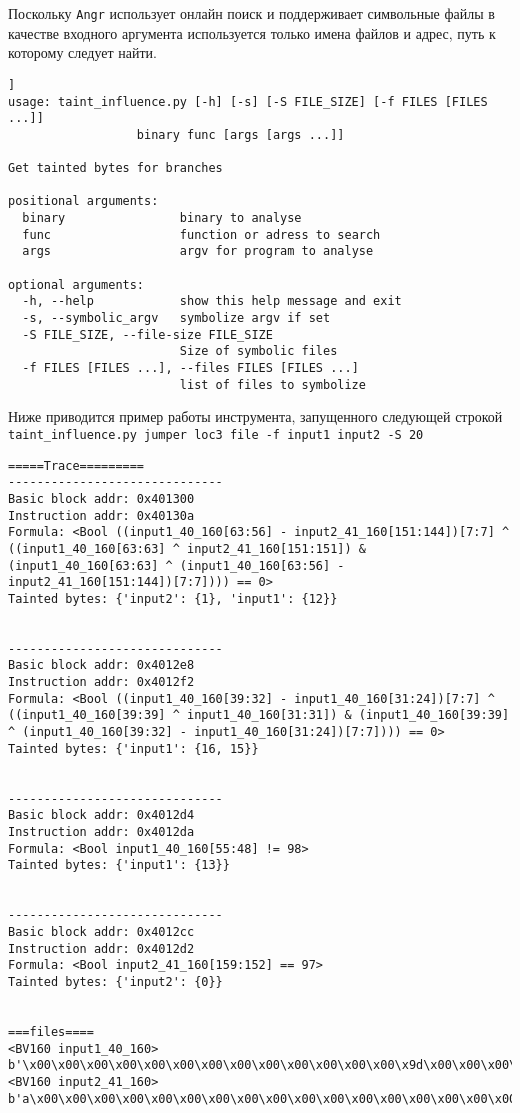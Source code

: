 Поскольку \texttt{Angr} использует онлайн поиск и поддерживает символьные файлы в качестве входного аргумента используется только имена файлов и адрес, путь к которому следует найти.

\begin{lstlisting}[caption=Интерфейс инструмента основанного на angr, captionpos=b]]
usage: taint_influence.py [-h] [-s] [-S FILE_SIZE] [-f FILES [FILES ...]]
                  binary func [args [args ...]]

Get tainted bytes for branches

positional arguments:
  binary                binary to analyse
  func                  function or adress to search
  args                  argv for program to analyse

optional arguments:
  -h, --help            show this help message and exit
  -s, --symbolic_argv   symbolize argv if set
  -S FILE_SIZE, --file-size FILE_SIZE
                        Size of symbolic files
  -f FILES [FILES ...], --files FILES [FILES ...]
                        list of files to symbolize
\end{lstlisting}

Ниже приводится пример работы инструмента, запущенного следующей строкой \texttt{taint\_influence.py jumper loc3 file -f input1 input2 -S 20}

\begin{lstlisting}[caption=Пример работы инструмента,captionpos=b]
=====Trace=========
------------------------------
Basic block addr: 0x401300
Instruction addr: 0x40130a
Formula: <Bool ((input1_40_160[63:56] - input2_41_160[151:144])[7:7] ^ ((input1_40_160[63:63] ^ input2_41_160[151:151]) & (input1_40_160[63:63] ^ (input1_40_160[63:56] - input2_41_160[151:144])[7:7]))) == 0>
Tainted bytes: {'input2': {1}, 'input1': {12}}


------------------------------
Basic block addr: 0x4012e8
Instruction addr: 0x4012f2
Formula: <Bool ((input1_40_160[39:32] - input1_40_160[31:24])[7:7] ^ ((input1_40_160[39:39] ^ input1_40_160[31:31]) & (input1_40_160[39:39] ^ (input1_40_160[39:32] - input1_40_160[31:24])[7:7]))) == 0>
Tainted bytes: {'input1': {16, 15}}


------------------------------
Basic block addr: 0x4012d4
Instruction addr: 0x4012da
Formula: <Bool input1_40_160[55:48] != 98>
Tainted bytes: {'input1': {13}}


------------------------------
Basic block addr: 0x4012cc
Instruction addr: 0x4012d2
Formula: <Bool input2_41_160[159:152] == 97>
Tainted bytes: {'input2': {0}}


===files====
<BV160 input1_40_160>
b'\x00\x00\x00\x00\x00\x00\x00\x00\x00\x00\x00\x00\x00\x9d\x00\x00\x00\x00\x00\x00'
<BV160 input2_41_160>
b'a\x00\x00\x00\x00\x00\x00\x00\x00\x00\x00\x00\x00\x00\x00\x00\x00\x00\x00\x00'
\end{lstlisting}

